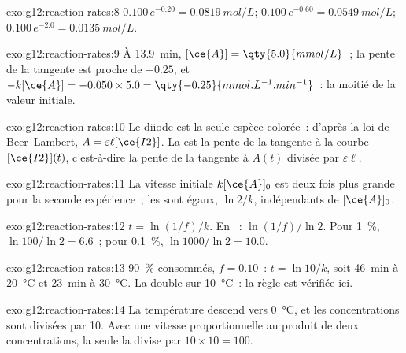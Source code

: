 \begin{solution}{exo:g12:reaction-rates:8}
$0.100\,e^{-0.20} = \qty{0.0819}{mol/L}$; $0.100\,e^{-0.60} =
\qty{0.0549}{mol/L}$; $0.100\,e^{-2.0} = \qty{0.0135}{mol/L}$.
\end{solution}

\begin{solution}{exo:g12:reaction-rates:9}
À \qty{13.9}{min}, $[\ce{A}] = \qty{5.0}{mmol/L}$~; la pente de la
tangente est proche de $-0.25$, et $-k[\ce{A}] = -0.050 \times 5.0 =
\qty{-0.25}{mmol.L^{-1}.min^{-1}}$~: la moitié de la valeur initiale.
\end{solution}

\begin{solution}{exo:g12:reaction-rates:10}
Le diiode est la seule espèce colorée~: d'après la loi de Beer--Lambert,
$A = \varepsilon \ell [\ce{I2}]$. La  est la pente
de la tangente à la courbe $[\ce{I2}](t)$, c'est-à-dire la pente de la
tangente à $A(t)$ divisée par $\varepsilon \ell$.
\end{solution}

\begin{solution}{exo:g12:reaction-rates:11}
La vitesse initiale $k[\ce{A}]_0$ est deux fois plus grande pour la
seconde expérience~; les  sont égaux,
$\ln 2 / k$, indépendants de $[\ce{A}]_0$.
\end{solution}

\begin{solution}{exo:g12:reaction-rates:12}
$t = \ln(1/f)/k$. En ~: $\ln(1/f)/\ln 2$. Pour
\qty{1}{\percent},
$\ln 100 / \ln 2 = 6.6$~; pour \qty{0.1}{\percent}, $\ln 1000 / \ln 2 =
10.0$.
\end{solution}

\begin{solution}{exo:g12:reaction-rates:13}
\qty{90}{\percent} consommés, $f = 0.10$~: $t = \ln 10 / k$, soit
\qty{46}{min} à \qty{20}{\celsius} et \qty{23}{min} à
\qty{30}{\celsius}. La  double sur
\qty{10}{\celsius}~: la règle est vérifiée ici.
\end{solution}

\begin{solution}{exo:g12:reaction-rates:14}
La température descend vers \qty{0}{\celsius}, et les concentrations
sont divisées par 10. Avec une vitesse proportionnelle au produit de
deux concentrations, la seule  la divise par
$10 \times 10 = 100$.
\end{solution}

